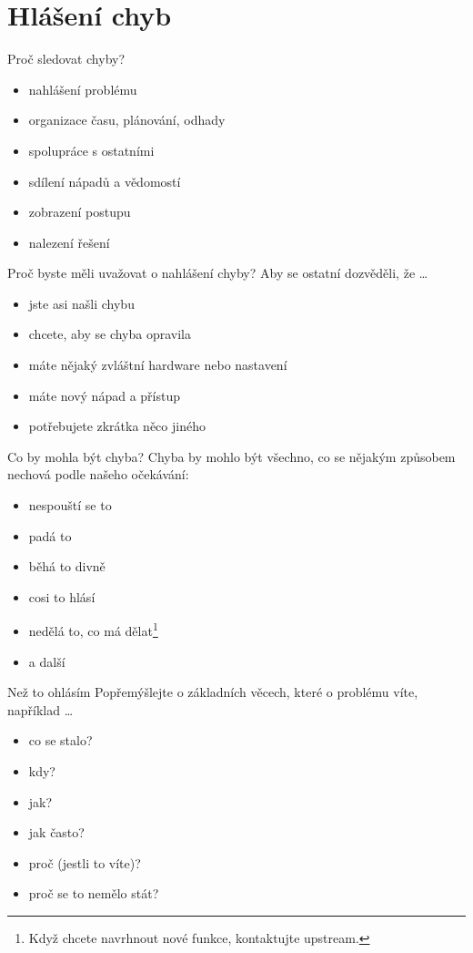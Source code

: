\documentclass[12pt,aspectratio=169]{beamer}
\begin{document}
\section{Hlášení chyb}
\begin{frame}{Proč sledovat chyby?}

\begin{itemize}
	\item nahlášení problému
	\item organizace času, plánování, odhady
	\item spolupráce s ostatními
	\item sdílení nápadů a vědomostí
	\item zobrazení postupu
	\item nalezení řešení
\end{itemize}
\end{frame}

\begin{frame}{Proč byste měli uvažovat o nahlášení chyby?}
Aby se ostatní dozvěděli, že  \ldots{}
\begin{itemize}
	\item jste asi našli chybu
	\item chcete, aby se chyba opravila
	\item máte nějaký zvláštní hardware nebo nastavení
	\item máte nový nápad a přístup
	\item potřebujete zkrátka něco jiného
\end{itemize}

\end{frame}

\begin{frame}{Co by mohla být chyba?}
Chyba by mohlo být všechno, co se nějakým způsobem nechová podle našeho očekávání:
\begin{itemize}
	\item nespouští se to
	\item padá to
	\item běhá to divně
	\item cosi to hlásí
	\item nedělá to, co má dělat\footnote{Když chcete navrhnout nové funkce, kontaktujte upstream.}
	\item a další
\end{itemize}

\end{frame}

\begin{frame}{Než to ohlásím}
Popřemýšlejte o základních věcech, které o problému víte, například \ldots

\begin{itemize}
	\item co se stalo?
	\item kdy? 
	\item jak? 
	\item jak často?
	\item proč (jestli to víte)?
	\item proč se to nemělo stát?
\end{itemize}	
\end{frame}
\end{document}
